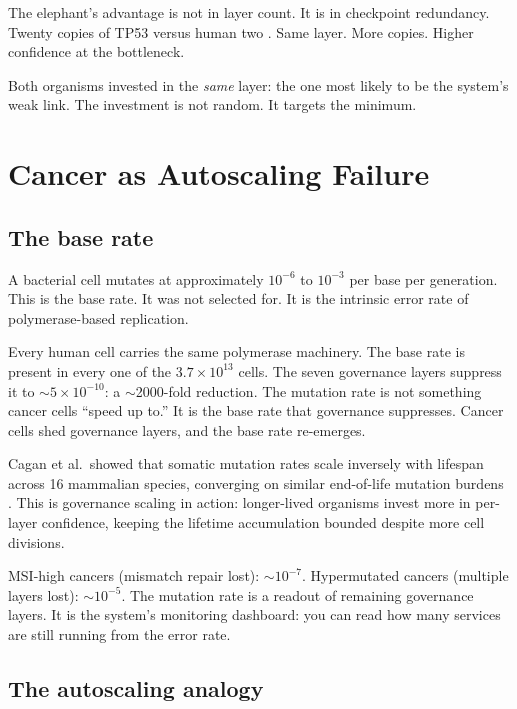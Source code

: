 \documentclass[11pt]{article}
\theoremstyle{definition}
\begin{document}
The elephant's advantage is not in layer count. It is in checkpoint
redundancy. Twenty copies of TP53 versus human two \cite{Sulak2016}.
Same layer. More copies. Higher confidence at the bottleneck.

Both organisms invested in the \emph{same} layer: the one most
likely to be the system's weak link. The investment is not random.
It targets the minimum.

\section{Cancer as Autoscaling Failure}
\label{sec:autoscaling}

\subsection{The base rate}

A bacterial cell mutates at approximately $10^{-6}$ to $10^{-3}$ per
base per generation. This is the base rate. It was not selected for.
It is the intrinsic error rate of polymerase-based replication.

Every human cell carries the same polymerase machinery. The base rate
is present in every one of the $3.7 \times 10^{13}$ cells. The seven
governance layers suppress it to $\sim 5 \times 10^{-10}$: a
$\sim$2000-fold reduction. The mutation rate is not something cancer
cells ``speed up to.'' It is the base rate that governance suppresses.
Cancer cells shed governance layers, and the base rate re-emerges.

Cagan et al.\ showed that somatic mutation rates scale inversely with
lifespan across 16 mammalian species, converging on similar end-of-life
mutation burdens \cite{Cagan2022}. This is governance scaling in action:
longer-lived organisms invest more in per-layer confidence, keeping the
lifetime accumulation bounded despite more cell divisions.

MSI-high cancers (mismatch repair lost): $\sim 10^{-7}$. Hypermutated
cancers (multiple layers lost): $\sim 10^{-5}$. The mutation rate is
a readout of remaining governance layers. It is the system's monitoring
dashboard: you can read how many services are still running from the
error rate.

\subsection{The autoscaling analogy}
\end{document}
